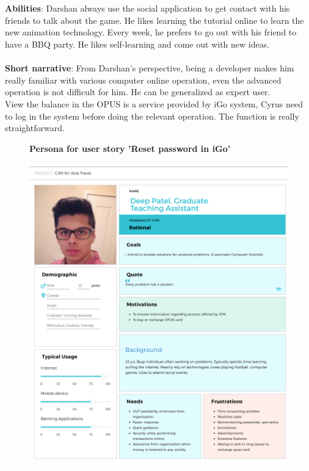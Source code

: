 \documentclass[11pt, english]{report}
\begin{document}
\\\\
\textbf{Abilities}: Darshan always use the social application to get contact with his friends to talk about the game. He likes learning the tutorial online to learn the new animation technology. Every week, he prefers to go out with his friend to have a BBQ party. He likes self-learning and come out with new ideas.
\\\\
\textbf{Short narrative}: From Darshan's perspective, being a developer makes him really familiar with various computer online operation, even the advanced operation is not difficult for him. He can be generalized as expert user. \\

View the balance in the OPUS is a service provided by iGo system, Cyrus need to log in the system before doing the relevant operation. The function is really straightforward.\\



\begin{figure}[H]
\textbf{Persona for user story 'Reset password in iGo'}
\\\\
  \includegraphics[width=1\textwidth]{images/Deep Patel Overleaf.png}
  \centering
\end{figure}
\end{document}
